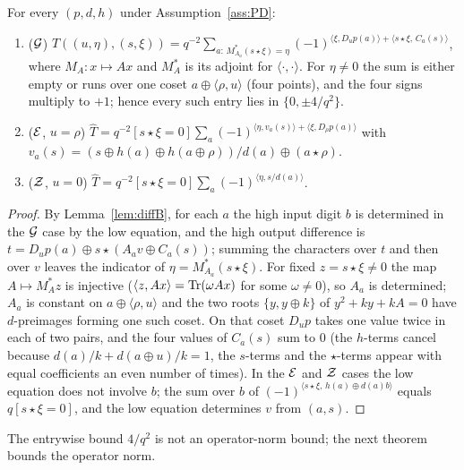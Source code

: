 \begin{proposition}\label{prop:pf}
For every $(p,d,h)$ under Assumption~\ref{ass:PD}:
\begin{enumerate}
\item ($\mathcal{G}$) $\widehat T((u,\eta),(s,\xi))=q^{-2}\sum_{a:\,M_{A_a}^\ast(s\star\xi)=\eta}
(-1)^{\langle\xi,D_up(a)\rangle+\langle s\star\xi,\,C_a(s)\rangle}$, where $M_A:x\mapsto Ax$ and $M_A^\ast$ is its adjoint for
$\langle\cdot,\cdot\rangle$. For $\eta\ne0$ the sum is either empty or runs over one coset $a\oplus\langle\rho,u\rangle$
(four points), and the four signs multiply to $+1$; hence every such entry lies in $\{0,\pm4/q^2\}$.
\item ($\mathcal{E}$, $u=\rho$) $\widehat T=q^{-2}[s\star\xi=0]\sum_a(-1)^{\langle\eta,v_a(s)\rangle+\langle\xi,D_\rho p(a)\rangle}$ with
$v_a(s)=(s\oplus h(a)\oplus h(a\oplus\rho))/d(a)\oplus(a\star\rho)$.
\item ($\mathcal{Z}$, $u=0$) $\widehat T=q^{-2}[s\star\xi=0]\sum_a(-1)^{\langle\eta,s/d(a)\rangle}$.
\end{enumerate}
\end{proposition}
\begin{proof}
By Lemma~\ref{lem:diffB}, for each $a$ the high input digit $b$ is determined in the $\mathcal{G}$ case by the low
equation, and the high output difference is $t=D_up(a)\oplus s\star(A_av\oplus C_a(s))$; summing the characters
over $t$ and then over $v$ leaves the indicator of $\eta=M_{A_a}^\ast(s\star\xi)$. For fixed $z=s\star\xi\ne0$ the map
$A\mapsto M_A^\ast z$ is injective ($\langle z,Ax\rangle=\mathrm{Tr}(\omega Ax)$ for some $\omega\ne0$), so $A_a$ is determined;
$A_a$ is constant on $a\oplus\langle\rho,u\rangle$ and the two roots $\{y,y\oplus k\}$ of $y^2+ky+kA=0$ have
$d$-preimages forming one such coset. On that coset $D_up$ takes one value twice in each of two pairs, and the
four values of $C_a(s)$ sum to $0$ (the $h$-terms cancel because $d(a)/k+d(a\oplus u)/k=1$, the $s$-terms and the
$\star$-terms appear with equal coefficients an even number of times). In the $\mathcal{E}$ and $\mathcal{Z}$ cases the low equation
does not involve $b$; the sum over $b$ of $(-1)^{\langle s\star\xi,\,h(a)\oplus d(a)b\rangle}$ equals $q[s\star\xi=0]$, and
the low equation determines $v$ from $(a,s)$.
\end{proof}
The entrywise bound $4/q^2$ is not an operator-norm bound; the next theorem bounds the operator norm.

